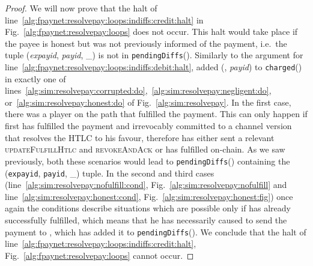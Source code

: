 \begin{proof}
  We will now prove that the halt of
  line~\ref{alg:fpaynet:resolvepay:loops:indiffs:credit:halt} in
  Fig.~\ref{alg:fpaynet:resolvepay:loops} does not occur. This halt would take
  place if the payee \bob{} is honest but was not previously informed of the
  payment, i.e.\ the tuple (\textit{expayid}, \textit{payid}, \_) is not in
  \texttt{pendingDiffs}(\bob). Similarly to the argument for
  line~\ref{alg:fpaynet:resolvepay:loops:indiffs:debit:halt}, \simulator{} added
  (\dave, \textit{payid}) to \texttt{charged}(\bob) in exactly one of
  lines~\ref{alg:sim:resolvepay:corrupted:do},~\ref{alg:sim:resolvepay:negligent:do},
  or~\ref{alg:sim:resolvepay:honest:do} of Fig.~\ref{alg:sim:resolvepay}. In the
  first case, there was a player on the path that fulfilled the payment. This
  can only happen if first \bob{} has fulfilled the payment and irrevocably
  committed to a channel version that resolves the HTLC to his favour, therefore
  \bob{} has either sent a relevant \textsc{updateFulfillHtlc} and
  \textsc{revokeAndAck} or has fulfilled on-chain. As we saw previously, both
  these scenarios would lead to \texttt{pendingDiffs}(\bob) containing the
  (\texttt{expayid}, \texttt{payid}, \_) tuple. In the second and third cases
  (line~\ref{alg:sim:resolvepay:nofulfill:cond},
  Fig.~\ref{alg:sim:resolvepay:nofulfill} and
  line~\ref{alg:sim:resolvepay:honest:cond},
  Fig.~\ref{alg:sim:resolvepay:honest:fig}) once again the conditions describe
  situations which are possible only if \bob{} has already successfully
  fulfilled, which means that he has necessarily caused \simulator{} to send the
  payment to \fpaynet{}, which has added it to \texttt{pendingDiffs}(\bob). We
  conclude that the halt of
  line~\ref{alg:fpaynet:resolvepay:loops:indiffs:credit:halt},
  Fig.~\ref{alg:fpaynet:resolvepay:loops} cannot occur.


\end{proof}

